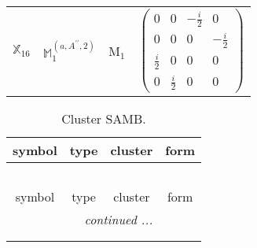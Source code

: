 \documentclass[fleqn,10pt,landscape]{article}
\begin{document}
\begin{itemize}
\begin{center}
\begin{longtable}{c|c|c|c}
$ \mathbb{X}_{16} $ & $\mathbb{M}_{1}^{(a,A^{\prime\prime},2)}$ & M$_{1}$ & $\begin{pmatrix} 0 & 0 & - \frac{i}{2} & 0 \\ 0 & 0 & 0 & - \frac{i}{2} \\ \frac{i}{2} & 0 & 0 & 0 \\ 0 & \frac{i}{2} & 0 & 0 \end{pmatrix}$ \\
\end{longtable}
\end{center}
\begin{center}
\renewcommand{\arraystretch}{1.3}
\begin{longtable}{c|c|c|c}
\caption{Cluster SAMB.}
 \\
 \hline \hline
symbol & type & cluster & form \\ \hline \endfirsthead

\multicolumn{3}{l}{\tablename\ \thetable{}} \\
 \hline \hline
symbol & type & cluster & form \\ \hline \endhead

 \hline \hline
\multicolumn{3}{r}{\footnotesize\it continued ...} \\ \endfoot

 \hline \hline
\multicolumn{3}{r}{} \\ \endlastfoot


\end{longtable}
\end{center}
\end{itemize}
\end{document}
